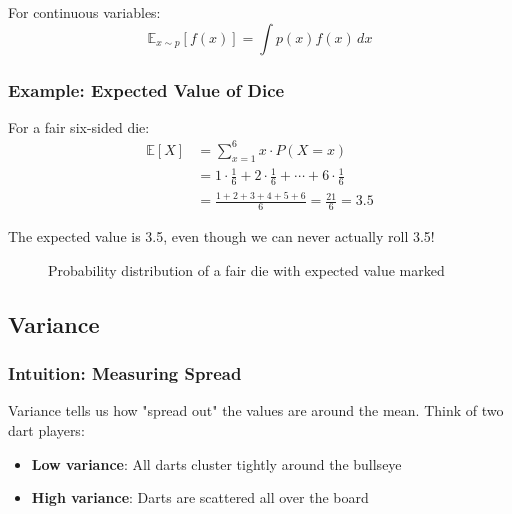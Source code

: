 For continuous variables:
\begin{equation}
\mathbb{E}_{x \sim p}[f(x)] = \int p(x) f(x) \, dx
\end{equation}

\subsubsection{Example: Expected Value of Dice}

For a fair six-sided die:
\begin{align}
\mathbb{E}[X] &= \sum_{x=1}^{6} x \cdot P(X=x) \\
&= 1 \cdot \frac{1}{6} + 2 \cdot \frac{1}{6} + \cdots + 6 \cdot \frac{1}{6} \\
&= \frac{1+2+3+4+5+6}{6} = \frac{21}{6} = 3.5
\end{align}

The expected value is 3.5, even though we can never actually roll 3.5!

\begin{figure}[h]
\centering
{}
\caption{Probability distribution of a fair die with expected value marked}
\label{fig:dice-expectation}
\end{figure}

\subsection{Variance}

\subsubsection{Intuition: Measuring Spread}

Variance tells us how "spread out" the values are around the mean. Think of two dart players:
\begin{itemize}
    \item \textbf{Low variance}: All darts cluster tightly around the bullseye
    \item \textbf{High variance}: Darts are scattered all over the board
\end{itemize}

